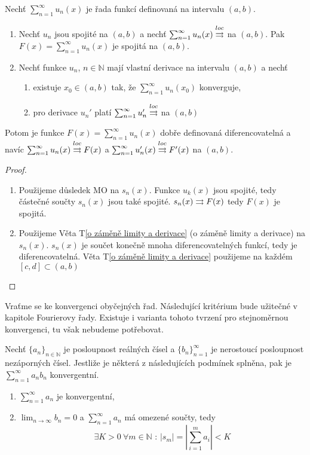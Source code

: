 \begin{vetal}
\label{o spojitosti a derivování řad funkcí}
Nechť $\sum_{n=1}^{\infty} u_n (x)$ je řada funkcí definovaná na intervalu $(a,b)$.
\begin{enumerate}
\item Nechť $u_n$ jsou spojité na $(a,b)$ a nechť $\sum_{n=1}^{\infty} u_n (x) \overset{loc}{\rightrightarrows}$ na $(a,b)$. Pak $F (x) = \sum_{n=1}^{\infty} u_n (x)$ je spojitá na $(a,b)$.
\item Nechť funkce $u_n$, $n \in \mathbb{N}$ mají vlastní derivace na intervalu $(a,b)$ a nechť
	\begin{enumerate}
	\item existuje $x_0 \in (a,b)$ tak, že $\sum_{n=1}^{\infty} u_n (x_0)$ konverguje,
	\item pro derivace $u_n'$ platí $\sum_{n=1}^{\infty} u_n' \overset{loc}{\rightrightarrows}$ na $(a,b)$
	\end{enumerate}
\end{enumerate}
Potom je funkce $F(x) = \sum_{n=1}^{\infty} u_n (x)$ dobře definovaná diferencovatelná a navíc $\sum_{n=1}^{\infty} u_n (x) \overset{loc}{\rightrightarrows} F(x)$ a $\sum_{n=1}^{\infty} u'_n (x) \overset{loc}{\rightrightarrows} F'(x)$ na $(a,b)$.
\end{vetal}
\begin{proof}
\begin{enumerate}

\item Použijeme důsledek MO na $s_n(x) $. Funkce $u_k(x)$ jsou spojité, tedy částečné součty $s_n(x)$ jsou také spojité. $s_n(x) \rightrightarrows F(x)$ tedy $F(x)$ je spojitá.
\item Použijeme Věta T\ref{o záměně limity a derivace} (o záměně limity a derivace) na $s_n(x)$. $s_n(x)$ je součet konečně mnoha diferencovatelných funkcí, tedy je diferencovatelná. Věta T\ref{o záměně limity a derivace} použijeme na každém $[c,d] \subset (a,b)$
\end{enumerate}
\end{proof}


Vraťme se ke konvergenci obyčejných řad. Následující kritérium bude užitečné v kapitole Fourierovy řady. Existuje i varianta tohoto tvrzení pro stejnoměrnou konvergenci, tu však nebudeme potřebovat.

\begin{vetabd}
Nechť $\{a_n\}_{n \in \mathbb{N}}$ je posloupnost reálných čísel a $\{b_n\}_{n=1}^{\infty}$ je nerostoucí posloupnost nezáporných čísel. Jestliže je některá z následujících podmínek splněna, pak je $\sum_{n=1}^{\infty} a_n b_n$ konvergentní.
\begin{enumerate}
\item $\sum_{n=1}^{\infty} a_n$ je konvergentní,
\item $\lim_{n \rightarrow \infty} b_n = 0$ a $\sum_{n=1}^{\infty} a_n$ má omezené součty, tedy
$$\exists K > 0 \ \forall m \in \mathbb{N} \textrm{ : } | s_m | = \left| \sum_{i=1}^{m} a_i \right| < K$$
\end{enumerate}
\end{vetabd}
